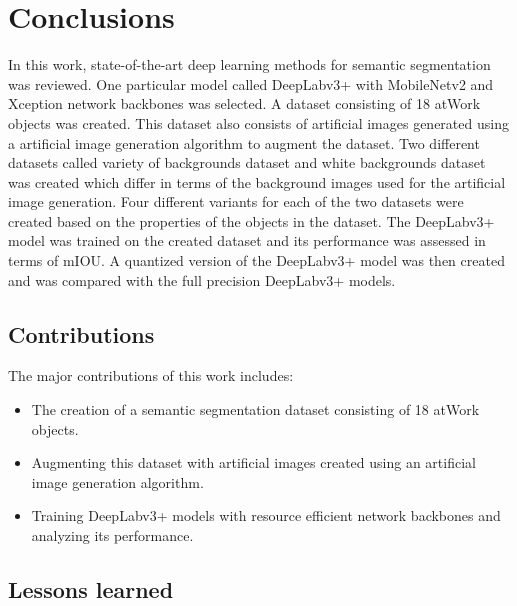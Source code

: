 
\chapter{Conclusions}

In this work, state-of-the-art deep learning methods for semantic segmentation was reviewed. One particular model called DeepLabv3+ with MobileNetv2 and Xception network backbones was selected. A dataset consisting of 18 atWork objects was created. This dataset also consists of artificial images generated using a artificial image generation algorithm to augment the dataset. Two different datasets called variety of backgrounds dataset and white backgrounds dataset was created which differ in terms of the background images used for the artificial image generation. Four different variants for each of the two datasets were created based on the properties of the objects in the dataset. The DeepLabv3+ model was trained on the created dataset and its performance was assessed in terms of mIOU. A quantized version of the DeepLabv3+ model was then created and was compared with the full precision DeepLabv3+ models.

\section{Contributions}

The major contributions of this work includes:
	\begin{itemize}
		\item The creation of a semantic segmentation dataset consisting of 18 atWork objects.
		\item Augmenting this dataset with artificial images created using an artificial image generation algorithm.
		\item Training DeepLabv3+ models with resource efficient network backbones and analyzing its performance.
	\end{itemize}

\section{Lessons learned}

